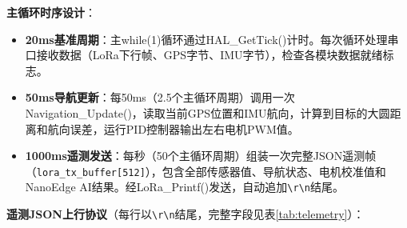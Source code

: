 \documentclass[12pt,a4paper]{ctexart}
\begin{document}
\textbf{主循环时序设计}：

\begin{itemize}
    \item \textbf{20ms基准周期}：主while(1)循环通过HAL\_GetTick()计时。每次循环处理串口接收数据（LoRa下行帧、GPS字节、IMU字节），检查各模块数据就绪标志。

    \item \textbf{50ms导航更新}：每50ms（2.5个主循环周期）调用一次Navigation\_Update()，读取当前GPS位置和IMU航向，计算到目标的大圆距离和航向误差，运行PID控制器输出左右电机PWM值。

    \item \textbf{1000ms遥测发送}：每秒（50个主循环周期）组装一次完整JSON遥测帧（\texttt{lora\_tx\_buffer[512]}），包含全部传感器值、导航状态、电机校准值和NanoEdge AI结果。经LoRa\_Printf()发送，自动追加\texttt{\textbackslash r\textbackslash n}结尾。
\end{itemize}

\textbf{遥测JSON上行协议}（每行以\texttt{\textbackslash r\textbackslash n}结尾，完整字段见表\ref{tab:telemetry}）：
\end{document}
